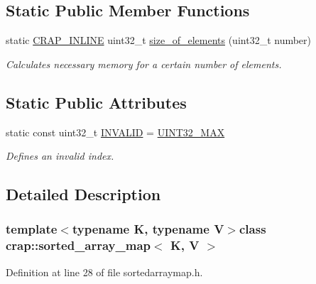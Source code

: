 \subsection*{Static Public Member Functions}
\begin{DoxyCompactItemize}
\item 
static \hyperlink{config__x86_8h_a5a40526b8d842e7ff731509998bb0f1c}{C\+R\+A\+P\+\_\+\+I\+N\+L\+I\+N\+E} uint32\+\_\+t \hyperlink{classcrap_1_1sorted__array__map_a9711c1ce96629b5f99999ced57c693e8}{size\+\_\+of\+\_\+elements} (uint32\+\_\+t number)
\begin{DoxyCompactList}\small\item\em Calculates necessary memory for a certain number of elements. \end{DoxyCompactList}\end{DoxyCompactItemize}
\subsection*{Static Public Attributes}
\begin{DoxyCompactItemize}
\item 
static const uint32\+\_\+t \hyperlink{classcrap_1_1sorted__array__map_a06a093e7319d7e543f47fbb5e0635a3a}{I\+N\+V\+A\+L\+I\+D} = \hyperlink{crap__types_8h_ab5eb23180f7cc12b7d6c04a8ec067fdd}{U\+I\+N\+T32\+\_\+\+M\+A\+X}
\begin{DoxyCompactList}\small\item\em Defines an invalid index. \end{DoxyCompactList}\end{DoxyCompactItemize}


\subsection{Detailed Description}
\subsubsection*{template$<$typename K, typename V$>$class crap\+::sorted\+\_\+array\+\_\+map$<$ K, V $>$}



Definition at line 28 of file sortedarraymap.\+h.



